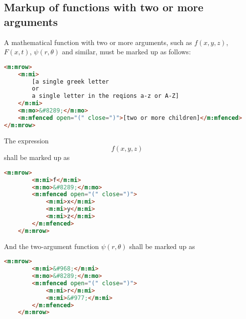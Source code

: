 \documentclass[english,a4paper,11pt]{article}
\begin{document}
\subsection{Markup of functions with two or more arguments}
A mathematical function with two or more arguments, such as $f(x,y,z)$, $F(x,t)$, $\psi (r, \theta )$ and similar, must be marked up as follows:
\begin{lstlisting}[language=HTML]
<m:mrow>
	<m:mi>
		[a single greek letter 
		or 
		a single letter in the reqions a-z or A-Z]
	</m:mi>
	<m:mo>&#8289;</m:mo>
	<m:mfenced open="(" close=")">[two or more children]</m:mfenced>
</m:mrow>
\end{lstlisting}


\begin{examples}
	The expression 
	\begin{equation}f(x,y,z)\end{equation}
	shall be marked up as
	\begin{lstlisting}[language=HTML]
	<m:mrow>
		<m:mi>f</m:mi>
		<m:mo>&#8289;</m:mo>
		<m:mfenced open="(" close=")">
			<m:mi>x</m:mi>
			<m:mi>y</m:mi>
			<m:mi>z</m:mi>
		</m:mfenced>
	</m:mrow>
	\end{lstlisting}
	
	And the two-argument function 
	$\psi (r, \theta )$
	shall be marked up as
	\begin{lstlisting}[language=HTML]
	<m:mrow>
		<m:mi>&#968;</m:mi>
		<m:mo>&#8289;</m:mo>
		<m:mfenced open="(" close=")">
			<m:mi>r</m:mi>
			<m:mi>&#977;</m:mi>
		</m:mfenced>
	</m:mrow>
	\end{lstlisting}
\end{examples}
\end{document}

